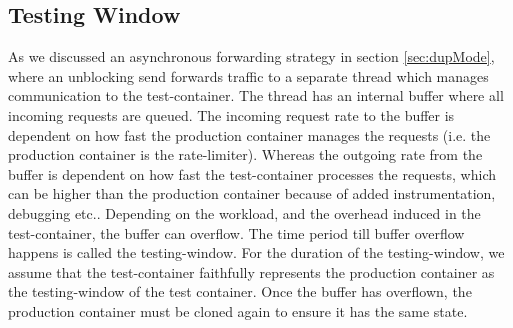 
\subsection{Testing Window}
\label{sec:window}

As we discussed an asynchronous forwarding strategy in section \ref{sec:dupMode}, where an unblocking send forwards traffic to a separate thread which manages communication to the test-container. 
The thread has an internal buffer where all incoming requests are queued. 
The incoming request rate to the buffer is dependent on how fast the production container manages the requests (i.e. the production container is the rate-limiter).
Whereas the outgoing rate from the buffer is dependent on how fast the test-container processes the requests, which can be higher than the production container because of added instrumentation, debugging etc..
Depending on the workload, and the overhead induced in the test-container, the buffer can overflow. 
The time period till buffer overflow happens is called the testing-window.
For the duration of the testing-window, we assume that the test-container faithfully represents the production container as the testing-window of the test container. 
Once the buffer has overflown, the production container must be cloned again to ensure it has the same state.

